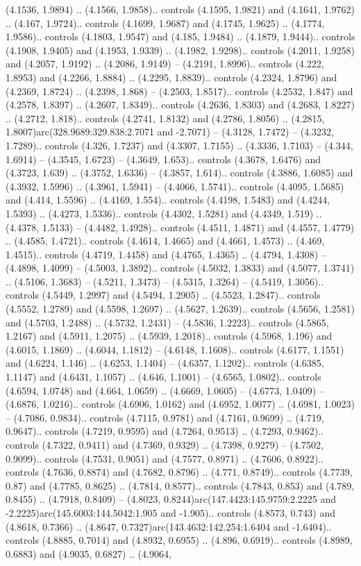 (4.1536, 1.9894) .. (4.1566, 1.9858).. controls (4.1595, 1.9821) and (4.1641, 1.9762) .. (4.167, 1.9724).. controls (4.1699, 1.9687) and (4.1745, 1.9625) .. (4.1774, 1.9586).. controls (4.1803, 1.9547) and (4.185, 1.9484) .. (4.1879, 1.9444).. controls (4.1908, 1.9405) and (4.1953, 1.9339) .. (4.1982, 1.9298).. controls (4.2011, 1.9258) and (4.2057, 1.9192) .. (4.2086, 1.9149) -- (4.2191, 1.8996).. controls (4.222, 1.8953) and (4.2266, 1.8884) .. (4.2295, 1.8839).. controls (4.2324, 1.8796) and (4.2369, 1.8724) .. (4.2398, 1.868) -- (4.2503, 1.8517).. controls (4.2532, 1.847) and (4.2578, 1.8397) .. (4.2607, 1.8349).. controls (4.2636, 1.8303) and (4.2683, 1.8227) .. (4.2712, 1.818).. controls (4.2741, 1.8132) and (4.2786, 1.8056) .. (4.2815, 1.8007)arc(328.9689:329.838:2.7071 and -2.7071) -- (4.3128, 1.7472) -- (4.3232, 1.7289).. controls (4.326, 1.7237) and (4.3307, 1.7155) .. (4.3336, 1.7103) -- (4.344, 1.6914) -- (4.3545, 1.6723) -- (4.3649, 1.653).. controls (4.3678, 1.6476) and (4.3723, 1.639) .. (4.3752, 1.6336) -- (4.3857, 1.614).. controls (4.3886, 1.6085) and (4.3932, 1.5996) .. (4.3961, 1.5941) -- (4.4066, 1.5741).. controls (4.4095, 1.5685) and (4.414, 1.5596) .. (4.4169, 1.554).. controls (4.4198, 1.5483) and (4.4244, 1.5393) .. (4.4273, 1.5336).. controls (4.4302, 1.5281) and (4.4349, 1.519) .. (4.4378, 1.5133) -- (4.4482, 1.4928).. controls (4.4511, 1.4871) and (4.4557, 1.4779) .. (4.4585, 1.4721).. controls (4.4614, 1.4665) and (4.4661, 1.4573) .. (4.469, 1.4515).. controls (4.4719, 1.4458) and (4.4765, 1.4365) .. (4.4794, 1.4308) -- (4.4898, 1.4099) -- (4.5003, 1.3892).. controls (4.5032, 1.3833) and (4.5077, 1.3741) .. (4.5106, 1.3683) -- (4.5211, 1.3473) -- (4.5315, 1.3264) -- (4.5419, 1.3056).. controls (4.5449, 1.2997) and (4.5494, 1.2905) .. (4.5523, 1.2847).. controls (4.5552, 1.2789) and (4.5598, 1.2697) .. (4.5627, 1.2639).. controls (4.5656, 1.2581) and (4.5703, 1.2488) .. (4.5732, 1.2431) -- (4.5836, 1.2223).. controls (4.5865, 1.2167) and (4.5911, 1.2075) .. (4.5939, 1.2018).. controls (4.5968, 1.196) and (4.6015, 1.1869) .. (4.6044, 1.1812) -- (4.6148, 1.1608).. controls (4.6177, 1.1551) and (4.6224, 1.146) .. (4.6253, 1.1404) -- (4.6357, 1.1202).. controls (4.6385, 1.1147) and (4.6431, 1.1057) .. (4.646, 1.1001) -- (4.6565, 1.0802).. controls (4.6594, 1.0748) and (4.664, 1.0659) .. (4.6669, 1.0605) -- (4.6773, 1.0409) -- (4.6876, 1.0216).. controls (4.6906, 1.0162) and (4.6952, 1.0077) .. (4.6981, 1.0023) -- (4.7086, 0.9834).. controls (4.7115, 0.9781) and (4.7161, 0.9699) .. (4.719, 0.9647).. controls (4.7219, 0.9595) and (4.7264, 0.9513) .. (4.7293, 0.9462).. controls (4.7322, 0.9411) and (4.7369, 0.9329) .. (4.7398, 0.9279) -- (4.7502, 0.9099).. controls (4.7531, 0.9051) and (4.7577, 0.8971) .. (4.7606, 0.8922).. controls (4.7636, 0.8874) and (4.7682, 0.8796) .. (4.771, 0.8749).. controls (4.7739, 0.87) and (4.7785, 0.8625) .. (4.7814, 0.8577).. controls (4.7843, 0.853) and (4.789, 0.8455) .. (4.7918, 0.8409) -- (4.8023, 0.8244)arc(147.4423:145.9759:2.2225 and -2.2225)arc(145.6003:144.5042:1.905 and -1.905).. controls (4.8573, 0.743) and (4.8618, 0.7366) .. (4.8647, 0.7327)arc(143.4632:142.254:1.6404 and -1.6404).. controls (4.8885, 0.7014) and (4.8932, 0.6955) .. (4.896, 0.6919).. controls (4.8989, 0.6883) and (4.9035, 0.6827) .. (4.9064, 